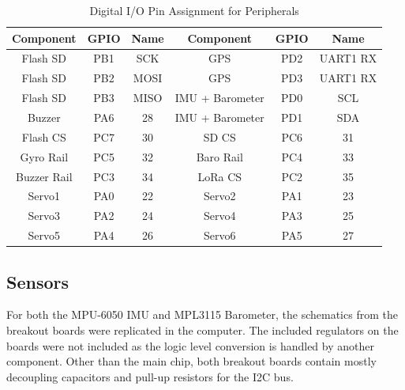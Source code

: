 \documentclass[conf]{new-aiaa}
\begin{document}
\begin{table}[H]
 \caption{\label{tab:pinout} Digital I/O Pin Assignment for Peripherals}
 \centering
 \begin{tabular}{ccc|ccc}

 \hline Component & GPIO & Name & Component & GPIO & Name \\ \hline

 Flash SD & PB1 & SCK & GPS & PD2 & UART1 RX\\
 Flash SD & PB2 & MOSI & GPS & PD3 & UART1 RX\\
 Flash SD & PB3 & MISO & IMU + Barometer & PD0 & SCL\\
 Buzzer & PA6 & 28 & IMU + Barometer & PD1 & SDA\\
 Flash CS & PC7 & 30 & SD CS & PC6 & 31\\
 Gyro Rail & PC5 & 32 & Baro Rail & PC4 & 33\\
 Buzzer Rail & PC3 & 34 & LoRa CS & PC2 & 35\\
 Servo1 & PA0 & 22 & Servo2 & PA1 & 23\\
 Servo3 & PA2 & 24 & Servo4 & PA3 & 25\\
 Servo5 & PA4 & 26 & Servo6 & PA5 & 27\\
 
 \hline
 \end{tabular}
 \end{table}

\pagebreak
\subsection{Sensors}

For both the MPU-6050 IMU and MPL3115 Barometer, the schematics from the breakout boards were replicated in the computer\cite{mpu6050sparkfun, mpl3115adafruit}. The included regulators on the boards were not included as the logic level conversion is handled by another component. Other than the main chip, both breakout boards contain mostly decoupling capacitors and pull-up resistors for the I2C bus.
\end{document}
